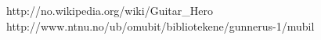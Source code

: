 \documentclass[pdftex,12pt,a4paper]{report}
\begin{document}




\tableofcontents














\begin{thebibliography}{9}
http://no.wikipedia.org/wiki/Guitar\_Hero
http://www.ntnu.no/ub/omubit/bibliotekene/gunnerus-1/mubil
\end{thebibliography}
\end{document}
